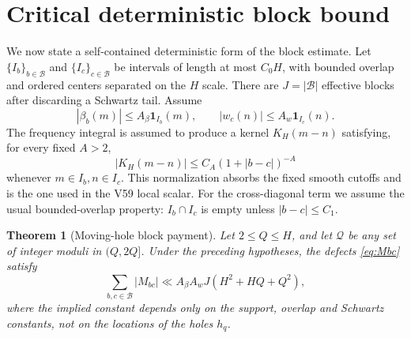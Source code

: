 \documentclass[11pt]{article}
\newtheorem{theorem}{Theorem}[section]
\newcommand{\one}{\mathbf 1}
\newcommand{\cQ}{\mathcal Q}
\begin{document}
\section{Critical deterministic block bound}

We now state a self-contained deterministic form of the block estimate.  Let
$\{I_b\}_{b\in\mathcal B}$ and $\{I_c\}_{c\in\mathcal B}$ be intervals of
length at most $C_0H$, with bounded overlap and ordered centers separated on
the $H$ scale.  There are $J=|\mathcal B|$ effective blocks after discarding
a Schwartz tail.  Assume
\[
 |\beta_b(m)|\le A_\beta\one_{I_b}(m),\qquad
 |w_c(n)|\le A_w\one_{I_c}(n).
\]
The frequency integral is assumed to produce a kernel $K_H(m-n)$ satisfying,
for every fixed $A>2$,
\begin{equation}\label{eq:kernel}
 |K_H(m-n)|\le C_A(1+|b-c|)^{-A}
\end{equation}
whenever $m\in I_b,n\in I_c$.  This normalization absorbs the fixed smooth
cutoffs and is the one used in the V59 local scalar.  For the cross-diagonal
term we assume the usual bounded-overlap property: $I_b\cap I_c$ is empty
unless $|b-c|\le C_1$.

\begin{theorem}[Moving-hole block payment]\label{thm:block}
Let $2\le Q\le H$, and let $\cQ$ be any set of integer moduli in $(Q,2Q]$.
Under the preceding hypotheses, the defects \eqref{eq:Mbc} satisfy
\begin{equation}\label{eq:block-bound}
 \boxed{
 \sum_{b,c\in\mathcal B}|M_{bc}|
 \ll A_\beta A_w J(H^2+HQ+Q^2),}
\end{equation}
where the implied constant depends only on the support, overlap and Schwartz
constants, not on the locations of the holes $h_q$.
\end{theorem}
\end{document}

